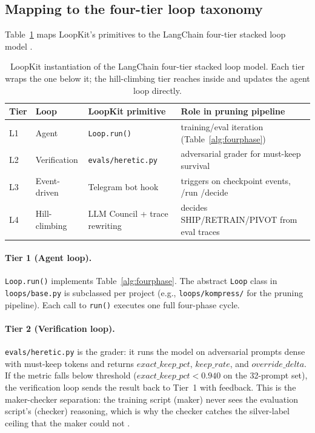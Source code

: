 \subsection{Mapping to the four-tier loop taxonomy}
\label{sec:loopkit:mapping}

Table~\ref{tab:loops} maps LoopKit's primitives to the LangChain four-tier
stacked loop model \citep{langchain2026loops}.

\begin{table}[h]
\centering
\caption{LoopKit instantiation of the LangChain four-tier stacked loop model.
Each tier wraps the one below it; the hill-climbing tier reaches inside and
updates the agent loop directly.}
\label{tab:loops}
\begin{tabular}{llll}
\toprule
Tier & Loop & LoopKit primitive & Role in pruning pipeline \\
\midrule
L1 & Agent        & \texttt{Loop.run()}              & training/eval iteration (Table~\ref{alg:fourphase}) \\
L2 & Verification & \texttt{evals/heretic.py}        & adversarial grader for must-keep survival \\
L3 & Event-driven & Telegram bot hook                & triggers on checkpoint events, /run /decide \\
L4 & Hill-climbing& LLM Council + trace rewriting    & decides SHIP/RETRAIN/PIVOT from eval traces \\
\bottomrule
\end{tabular}
\end{table}

\paragraph{Tier 1 (Agent loop).} \texttt{Loop.run()} implements
Table~\ref{alg:fourphase}. The abstract \texttt{Loop} class in
\texttt{loops/base.py} is subclassed per project (e.g.,
\texttt{loops/kompress/} for the pruning pipeline). Each call to
\texttt{run()} executes one full four-phase cycle.

\paragraph{Tier 2 (Verification loop).} \texttt{evals/heretic.py} is the
grader: it runs the model on adversarial prompts dense with must-keep tokens
and returns $\mathit{exact\_keep\_pct}$, $\mathit{keep\_rate}$, and
$\mathit{override\_delta}$. If the metric falls below threshold
($\mathit{exact\_keep\_pct} < 0.940$ on the 32-prompt set), the verification
loop sends the result back to Tier~1 with feedback. This is the
maker-checker separation: the training script (maker) never sees the
evaluation script's (checker) reasoning, which is why the checker catches
the silver-label ceiling that the maker could not
\citep{osmani2026loop}.

